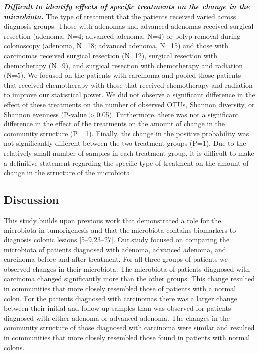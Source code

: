 \documentclass[12pt,]{article}
\begin{document}
\textbf{\emph{Difficult to identify effects of specific treatments on
the change in the microbiota.}} The type of treatment that the patients
received varied across diagnosis groups. Those with adenomas and
advanced adenomas received surgical resection (adenoma, N=4; advanced
adenoma, N=4) or polyp removal during colonoscopy (adenoma, N=18;
advanced adenoma, N=15) and those with carcinomas received surgical
resection (N=12), surgical resection with chemotherapy (N=9), and
surgical resection with chemotherapy and radiation (N=5). We focused on
the patients with carcinoma and pooled those patients that received
chemotherapy with those that received chemotherapy and radiation to
improve our statistical power. We did not observe a significant
difference in the effect of these treatments on the number of observed
OTUs, Shannon diversity, or Shannon evenness (P-value \textgreater{}
0.05). Furthermore, there was not a significant difference in the effect
of the treatments on the amount of change in the community structure (P=
1). Finally, the change in the positive probability was not
significantly different between the two treatment groups (P=1). Due to
the relatively small number of samples in each treatment group, it is
difficult to make a definitive statement regarding the specific type of
treatment on the amount of change in the structure of the microbiota

\newpage

\subsection{Discussion}\label{discussion}

This study builds upon previous work that demonstrated a role for the
microbiota in tumorigenesis and that the microbiota contains biomarkers
to diagnosis colonic lesions {[}5--9,23--27{]}. Our study focused on
comparing the microbiota of patients diagnosed with adenoma, advanced
adenoma, and carcinoma before and after treatment. For all three groups
of patients we observed changes in their microbiota. The microbiota of
patients diagnosed with carcinoma changed significantly more than the
other groups. This change resulted in communities that more closely
resembled those of patients with a normal colon. For the patients
diagnosed with carcinomas there was a larger change between their
initial and follow up samples than was observed for patients diagnosed
with either adenoma or advanced adenoma. The changes in the community
structure of those diagnosed with carcinoma were similar and resulted in
communities that more closely resembled those found in patients with
normal colons.
\end{document}
